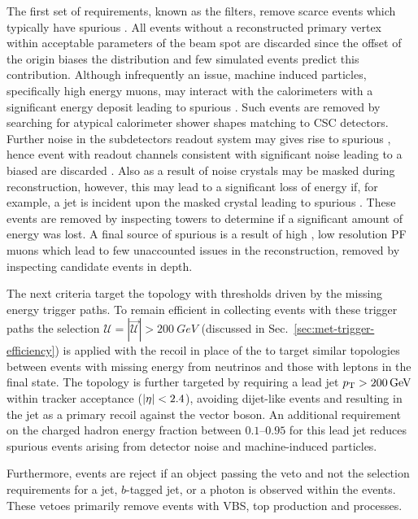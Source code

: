 The first set of requirements, known as the \ptmiss filters, remove scarce
events which typically have spurious \ptmiss. All events without a
reconstructed primary vertex within acceptable parameters of the beam spot are
discarded since the offset of the origin biases the \ptmiss distribution and
few simulated events predict this contribution. Although infrequently an
issue, machine induced particles, specifically high energy muons, may interact
with the calorimeters with a significant energy deposit leading to spurious
\ptmiss. Such events are removed by searching for atypical calorimeter shower
shapes matching to CSC detectors. Further noise in the \HCAL subdetectors
readout system may gives rise to spurious \ptmiss, hence event with \HCAL
readout channels consistent with significant noise leading to a biased \ptmiss
are discarded \cite{CMS-DP-2016-061}. Also as a result of noise \ECAL crystals
may be masked during reconstruction, however, this may lead to a significant
loss of energy if, for example, a jet is incident upon the masked crystal
leading to spurious \ptmiss. These events are removed by inspecting \HWT
towers to determine if a significant amount of energy was lost. A final source
of spurious \ptmiss is a result of high \pt, low resolution PF muons which
lead to few unaccounted issues in the reconstruction, removed by inspecting
candidate events in depth.

The next criteria target the \metplusjets topology with thresholds driven by
the missing energy trigger paths. To remain efficient in collecting events
with these trigger paths the selection
${\mathcal{U}=|\vec{\mathcal{U}}|>\SI{200}{GeV}}$ (discussed in
Sec.~\ref{sec:met-trigger-efficiency}) is applied with the recoil in place of
the \ptmiss to target similar topologies between events with missing energy
from neutrinos and those with leptons in the final state. The topology is
further targeted by requiring a lead jet ${p_{\text{T}}>\SI{200}{GeV}}$ within tracker
acceptance (${|\eta|<2.4}$), avoiding dijet-like events and resulting in the
jet as a primary recoil against the vector boson. An additional requirement on
the charged hadron energy fraction between {$0.1$--$0.95$} for this lead jet
reduces spurious \ptmiss events arising from detector noise and
machine-induced particles.

Furthermore, events are reject if an object passing the veto and not the
selection requirements for a jet, $b$-tagged jet, or a photon is observed
within the events. These vetoes primarily remove events with VBS, top
production and \Igj processes.


